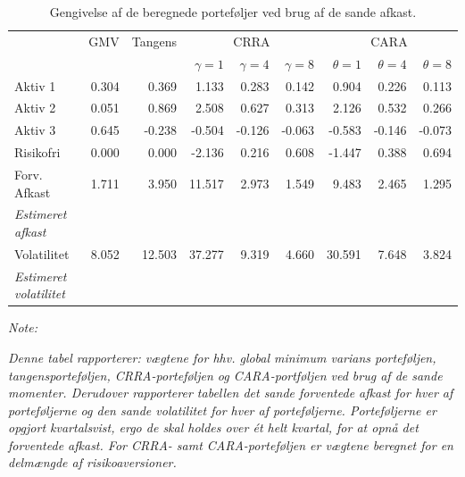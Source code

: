 \documentclass[
  a4paper,
  oneside]{memoir}
\begin{document}
\begin{table}[!h]
\caption{\label{tab:sum-true}Gengivelse af de beregnede porteføljer ved brug af de sande afkast.}
\centering
\begin{threeparttable}
\begin{tabular}[t]{lrrrrrrrr}
\toprule
\multicolumn{1}{c}{ } & \multicolumn{1}{c}{GMV} & \multicolumn{1}{c}{Tangens} & \multicolumn{3}{c}{CRRA} & \multicolumn{3}{c}{CARA} \\
\cmidrule(l{3pt}r{3pt}){2-2} \cmidrule(l{3pt}r{3pt}){3-3} \cmidrule(l{3pt}r{3pt}){4-6} \cmidrule(l{3pt}r{3pt}){7-9}
  &   &   & $\gamma=1$ & $\gamma=4$ & $\gamma=8$ & $\theta=1$ & $\theta=4$ & $\theta=8$\\
\midrule
\rowcolor{gray!6}  Aktiv 1 & 0.304 & 0.369 & 1.133 & 0.283 & 0.142 & 0.904 & 0.226 & 0.113\\
Aktiv 2 & 0.051 & 0.869 & 2.508 & 0.627 & 0.313 & 2.126 & 0.532 & 0.266\\
\rowcolor{gray!6}  Aktiv 3 & 0.645 & -0.238 & -0.504 & -0.126 & -0.063 & -0.583 & -0.146 & -0.073\\
Risikofri & 0.000 & 0.000 & -2.136 & 0.216 & 0.608 & -1.447 & 0.388 & 0.694\\
\rowcolor{gray!6}  Forv. Afkast & 1.711 & 3.950 & 11.517 & 2.973 & 1.549 & 9.483 & 2.465 & 1.295\\
\em{Estimeret afkast} & \em{} & \em{} & \em{} & \em{} & \em{} & \em{} & \em{} & \em{}\\
\rowcolor{gray!6}  Volatilitet & 8.052 & 12.503 & 37.277 & 9.319 & 4.660 & 30.591 & 7.648 & 3.824\\
\em{Estimeret volatilitet} & \em{} & \em{} & \em{} & \em{} & \em{} & \em{} & \em{} & \em{}\\
\bottomrule
\end{tabular}
\begin{tablenotes}
\item \textit{Note: } 
\item \textit{Denne tabel rapporterer: vægtene for hhv. global minimum varians porteføljen, tangensporteføljen, CRRA-porteføljen og CARA-portføljen ved brug af de sande momenter. Derudover rapporterer tabellen det sande forventede afkast for hver af porteføljerne og den sande volatilitet for hver af porteføljerne. Porteføljerne er opgjort kvartalsvist, ergo de skal holdes over ét helt kvartal, for at opnå det forventede afkast. For CRRA- samt CARA-porteføljen er vægtene beregnet for en delmængde af risikoaversioner.}
\end{tablenotes}
\end{threeparttable}
\end{table}
\end{document}

